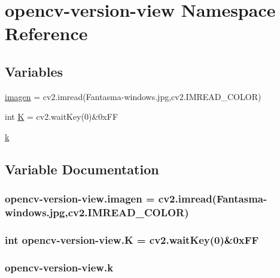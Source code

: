 \hypertarget{namespaceopencv-version-view}{}\section{opencv-\/version-\/view Namespace Reference}
\label{namespaceopencv-version-view}
\subsection*{Variables}
\begin{DoxyCompactItemize}
\item 
\hyperlink{namespaceopencv-version-view_a66a58f703e807f162b987835e63ac204}{imagen} = cv2.\+imread(\textquotesingle{}Fantasma-\/windows.\+jpg\textquotesingle{},cv2.\+I\+M\+R\+E\+A\+D\+\_\+\+C\+O\+L\+OR)
\item 
int \hyperlink{namespaceopencv-version-view_a59ebc577f16d2a8e4f47e63bdd8ed15e}{K} = cv2.\+wait\+Key(0)\&0x\+FF
\item 
\hyperlink{namespaceopencv-version-view_a9a0c0708fca0c8961fc6fdc34240ebed}{k}
\end{DoxyCompactItemize}


\subsection{Variable Documentation}
\subsubsection[{\texorpdfstring{imagen}{imagen}}]{\setlength{\rightskip}{0pt plus 5cm}opencv-\/version-\/view.\+imagen = cv2.\+imread(\textquotesingle{}Fantasma-\/windows.\+jpg\textquotesingle{},cv2.\+I\+M\+R\+E\+A\+D\+\_\+\+C\+O\+L\+OR)}\hypertarget{namespaceopencv-version-view_a66a58f703e807f162b987835e63ac204}{}\label{namespaceopencv-version-view_a66a58f703e807f162b987835e63ac204}
\subsubsection[{\texorpdfstring{K}{K}}]{\setlength{\rightskip}{0pt plus 5cm}int opencv-\/version-\/view.\+K = cv2.\+wait\+Key(0)\&0x\+FF}\hypertarget{namespaceopencv-version-view_a59ebc577f16d2a8e4f47e63bdd8ed15e}{}\label{namespaceopencv-version-view_a59ebc577f16d2a8e4f47e63bdd8ed15e}
\subsubsection[{\texorpdfstring{k}{k}}]{\setlength{\rightskip}{0pt plus 5cm}opencv-\/version-\/view.\+k}\hypertarget{namespaceopencv-version-view_a9a0c0708fca0c8961fc6fdc34240ebed}{}\label{namespaceopencv-version-view_a9a0c0708fca0c8961fc6fdc34240ebed}
